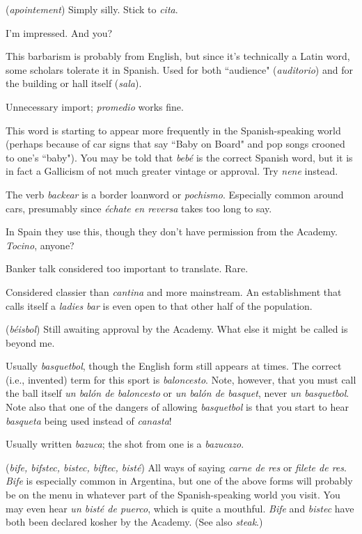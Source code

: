 (\emph{apointement}) Simply silly. Stick to \emph{cita}.

 I'm impressed. And you?

 This barbarism is probably from English, but
since it's technically a Latin word, some scholars tolerate it in Spanish. Used for both ``audience" (\emph{auditorio}) and for the building or hall
itself (\emph{sala}).

 Unnecessary import; \emph{promedio} works fine.

 This word is starting to appear more frequently in the
Spanish-speaking world (perhaps because of car signs that say ``Baby on
Board" and pop songs crooned to one's ``baby"). You may be told that
\emph{bebé} is the correct Spanish word, but it is in fact a Gallicism of not
much greater vintage or approval. Try \emph{nene} instead.

 The verb \emph{backear} is a border loanword or \emph{pochismo}.
Especially common around cars, presumably since \emph{échate en reversa}
takes too long to say.

 In Spain they use this, though they don't have permission from the Academy. \emph{Tocino}, anyone?

 Banker talk considered too important to translate. Rare.

 Considered classier than \emph{cantina} and more mainstream.
An establishment that calls itself a \emph{ladies bar} is even open to that
other half of the population.

 (\emph{béisbol}) Still awaiting approval by the Academy.
What else it might be called is beyond me.

 Usually \emph{basquetbol}, though the English form
still appears at times. The correct (i.e., invented) term for this sport is
\emph{baloncesto}. Note, however, that you must call the ball itself \emph{un balón
	de baloncesto} or \emph{un balón de basquet}, never \emph{un basquetbol}. Note also
that one of the dangers of allowing \emph{basquetbol} is that you start to hear
\emph{basqueta} being used instead of \emph{canasta}!

 Usually written \emph{bazuca}; the shot from one is a
\emph{bazucazo}.

 (\emph{bife, bifstec, bistec, biftec, bisté}) All ways of saying
\emph{carne de res} or \emph{filete de res}. \emph{Bife} is especially common in Argentina,
but one of the above forms will probably be on the menu in whatever
part of the Spanish-speaking world you visit. You may even hear \emph{un
	bisté de puerco}, which is quite a mouthful. \emph{Bife} and \emph{bistec} have both
been declared kosher by the Academy. (See also \emph{steak}.)

